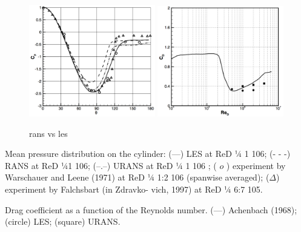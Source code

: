 \documentclass[journal]{new-aiaa}
\begin{document}
\begin{figure}[H]
\begin{center}
\includegraphics[width=0.49\textwidth]{Images/logan/catalano2003numerical_CylinderCp.pdf}
\includegraphics[width=0.49\textwidth]{Images/logan/catalano2003numerical_CylinderDrag.pdf}
\caption{ rans vs les \cite{catalano2003numerical} }
\label{fig:cylinderransvsdesvalidation}
\end{center}
\end{figure}


Mean pressure distribution on the cylinder: (—) LES at ReD 1⁄4 1 106; (- - -) RANS at ReD 1⁄41 106; (–.–) URANS at ReD 1⁄4 1   106 ; ( $o$ ) experiment by Warschauer and Leene (1971) at ReD 1⁄4 1:2   106 (spanwise averaged); ($\Delta$) experiment by Falchsbart (in Zdravko- vich, 1997) at ReD 1⁄4 6:7   105.


Drag coefficient as a function of the Reynolds number. (—) Achenbach (1968); (circle) LES; (square) URANS.
\end{document}
